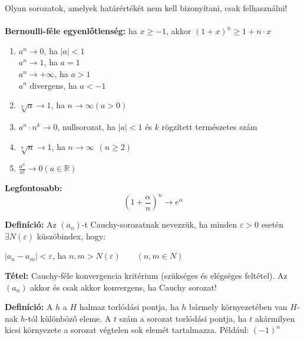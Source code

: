 \documentclass[12pt,a4paper]{article}
\begin{document}
\begin{tcolorbox}[colback=green!5!white,colframe=green!60!black,title= 3. Nevezetes sorozatok]
    Olyan sorozatok, amelyek határértékét nem kell bizonyítani, csak felhasználni!\\\\
    \textbf{Bernoulli-féle egyenlőtlenség:} ha \(x \geq  -1\), akkor \((1+x)^n \geq 1 + n\cdot x\)
    \begin{enumerate}
        \item \(a^n \to 0\), ha \(\left\lvert a\right\rvert <1\)\\
        \(a^n \to 1\), ha \(a=1\)\\
        \(a^n \to +\infty\), ha \(a>1\)\\
        \(a^n\) divergens, ha \(a<-1\)
        \item \(\sqrt[n]{a} \to 1\), ha \(n \to \infty (a>0)\)
        \item \(a^n\cdot n^k \rightarrow 0\), nullsorozat, ha \(\left\lvert a\right\rvert <1 \) és \(k\) rögzített természetes szám
        \item \(\sqrt[n]{n} \to 1\), ha \(n \to \infty \hspace{5pt}(n\geq 2)\)
        \item \(\frac{a^n}{n!} \to 0 (a \in \mathbb{R} )\)
    \end{enumerate}
    \textbf{Legfontosabb:}
    $$(1+\frac{\alpha}{n})^n \to e^{\alpha}$$
\end{tcolorbox}

\begin{tcolorbox}[colback=green!5!white,colframe=green!60!black,title= 4. Cauchy sorozat]
        \textbf{Definíció:} Az \((a_n)\)-t Cauchy-sorozatnak nevezzük, ha minden \(\varepsilon > 0\) esetén \(\exists N(\varepsilon)\) küszöbindex, hogy: 
        \begin{center}
            \(\left\lvert a_n -a_m\right\rvert  < \varepsilon\), ha \(n,m > N(\varepsilon)\) \(\hspace{15pt}\) \((n,m \in N)\)
        \end{center}
        \textbf{Tétel:} Cauchy-féle konvergencia kritérium (szükséges és elégséges feltétel). Az \((a_n)\) akkor és csak akkor konvergens, ha Cauchy sorozat!
\end{tcolorbox}

\begin{tcolorbox}[colback=green!5!white,colframe=green!60!black,title= 5. Torlódási pont]
        \textbf{Definíció:} A \(h\) a \(H\) halmaz torlódási pontja, ha \(h\) bármely környezetében van \(H\)-nak \(h\)-tól
        különböző eleme. A \(t\) szám a sorozat torlódási pontja, ha \(t\) akármilyen kicsi környezete a sorozat végtelen sok
        elemét tartalmazza. Például: \((-1)^n\)
\end{tcolorbox}
\newpage
\end{document}
